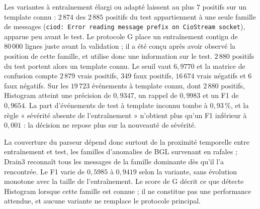 Les variantes à entraînement élargi ou adapté laissent au plus 7 positifs sur un template connu : $2\,874$ des $2\,885$ positifs du test appartiennent à une seule famille de messages (\texttt{ciod: Error reading message prefix on CioStream socket}), apparue peu avant le test. Le protocole G place un entraînement contigu de $80\,000$ lignes juste avant la validation ; il a été conçu après avoir observé la position de cette famille, et utilise donc une information sur le test. $2\,880$ positifs du test portent alors un template connu. Le seuil vaut $6{,}9770$ et la matrice de confusion compte $2\,879$ vrais positifs, 349 faux positifs, $16\,674$ vrais négatifs et 6 faux négatifs. Sur les $19\,723$ événements à template connu, dont $2\,880$ positifs, Histogram atteint une précision de $0{,}9347$, un rappel de $0{,}9983$ et un F1 de $0{,}9654$. La part d'événements de test à template inconnu tombe à $0{,}93\,\%$, et la règle « sévérité absente de l'entraînement » n'obtient plus qu'un F1 inférieur à $0{,}001$ : la décision ne repose plus sur la nouveauté de sévérité.

La couverture du parseur dépend donc surtout de la proximité temporelle entre entraînement et test, les familles d'anomalies de BGL survenant en rafales ; Drain3 reconnaît tous les messages de la famille dominante dès qu'il l'a rencontrée. Le F1 varie de $0{,}5985$ à $0{,}9419$ selon la variante, sans évolution monotone avec la taille de l'entraînement. Le score de G décrit ce que détecte Histogram lorsque cette famille est connue ; il ne constitue pas une performance attendue, et aucune variante ne remplace le protocole principal.

